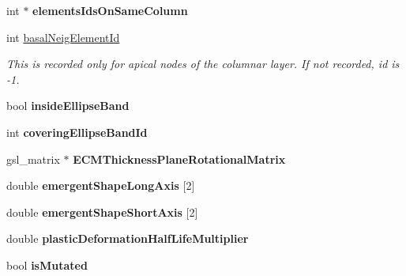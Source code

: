 \begin{DoxyCompactItemize}
\item 
\hypertarget{classShapeBase_af234eba58e529b7ce1514b334057b099}{}int $\ast$ {\bfseries elements\+Ids\+On\+Same\+Column}\label{classShapeBase_af234eba58e529b7ce1514b334057b099}

\item 
\hypertarget{classShapeBase_a7515f99cadce806894a7c254186a85f7}{}int \hyperlink{classShapeBase_a7515f99cadce806894a7c254186a85f7}{basal\+Neig\+Element\+Id}\label{classShapeBase_a7515f99cadce806894a7c254186a85f7}

\begin{DoxyCompactList}\small\item\em This is recorded only for apical nodes of the columnar layer. If not recorded, id is -\/1. \end{DoxyCompactList}\item 
\hypertarget{classShapeBase_a1571eea2fb8259868afa5814540fe61d}{}bool {\bfseries inside\+Ellipse\+Band}\label{classShapeBase_a1571eea2fb8259868afa5814540fe61d}

\item 
\hypertarget{classShapeBase_a8d2b9ded0e51df7c23499ccc3f4da9fc}{}int {\bfseries covering\+Ellipse\+Band\+Id}\label{classShapeBase_a8d2b9ded0e51df7c23499ccc3f4da9fc}

\item 
\hypertarget{classShapeBase_a10bb522c936642dbc723208544c7d768}{}gsl\+\_\+matrix $\ast$ {\bfseries E\+C\+M\+Thickness\+Plane\+Rotational\+Matrix}\label{classShapeBase_a10bb522c936642dbc723208544c7d768}

\item 
\hypertarget{classShapeBase_a1484f5942bbd147ce0e9e1d842919103}{}double {\bfseries emergent\+Shape\+Long\+Axis} \mbox{[}2\mbox{]}\label{classShapeBase_a1484f5942bbd147ce0e9e1d842919103}

\item 
\hypertarget{classShapeBase_a60c845ab5c6b7e8083faa1a9833765f7}{}double {\bfseries emergent\+Shape\+Short\+Axis} \mbox{[}2\mbox{]}\label{classShapeBase_a60c845ab5c6b7e8083faa1a9833765f7}

\item 
\hypertarget{classShapeBase_a30219b72a2e37fad6ad5dfbcb371a85e}{}double {\bfseries plastic\+Deformation\+Half\+Life\+Multiplier}\label{classShapeBase_a30219b72a2e37fad6ad5dfbcb371a85e}

\item 
\hypertarget{classShapeBase_a3633ac9356d82c0259770ace63ca3d3d}{}bool {\bfseries is\+Mutated}\label{classShapeBase_a3633ac9356d82c0259770ace63ca3d3d}


\end{DoxyCompactItemize}
